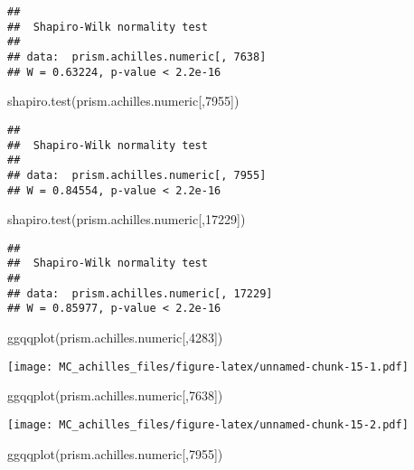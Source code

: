 \documentclass[
]{article}
\newenvironment{Shaded}{\begin{snugshade}}{\end{snugshade}}
\newcommand{\DecValTok}[1]{\textcolor[rgb]{0.00,0.00,0.81}{#1}}
\newcommand{\FunctionTok}[1]{\textcolor[rgb]{0.00,0.00,0.00}{#1}}
\newcommand{\NormalTok}[1]{#1}
\begin{document}
\begin{verbatim}
## 
##  Shapiro-Wilk normality test
## 
## data:  prism.achilles.numeric[, 7638]
## W = 0.63224, p-value < 2.2e-16
\end{verbatim}

\begin{Shaded}
\begin{Highlighting}[]
\FunctionTok{shapiro.test}\NormalTok{(prism.achilles.numeric[,}\DecValTok{7955}\NormalTok{])}
\end{Highlighting}
\end{Shaded}

\begin{verbatim}
## 
##  Shapiro-Wilk normality test
## 
## data:  prism.achilles.numeric[, 7955]
## W = 0.84554, p-value < 2.2e-16
\end{verbatim}

\begin{Shaded}
\begin{Highlighting}[]
\FunctionTok{shapiro.test}\NormalTok{(prism.achilles.numeric[,}\DecValTok{17229}\NormalTok{])}
\end{Highlighting}
\end{Shaded}

\begin{verbatim}
## 
##  Shapiro-Wilk normality test
## 
## data:  prism.achilles.numeric[, 17229]
## W = 0.85977, p-value < 2.2e-16
\end{verbatim}

\begin{Shaded}
\begin{Highlighting}[]
\FunctionTok{ggqqplot}\NormalTok{(prism.achilles.numeric[,}\DecValTok{4283}\NormalTok{])}
\end{Highlighting}
\end{Shaded}

\texttt{[image: MC\_achilles\_files/figure-latex/unnamed-chunk-15-1.pdf]}

\begin{Shaded}
\begin{Highlighting}[]
\FunctionTok{ggqqplot}\NormalTok{(prism.achilles.numeric[,}\DecValTok{7638}\NormalTok{])}
\end{Highlighting}
\end{Shaded}

\texttt{[image: MC\_achilles\_files/figure-latex/unnamed-chunk-15-2.pdf]}

\begin{Shaded}
\begin{Highlighting}[]
\FunctionTok{ggqqplot}\NormalTok{(prism.achilles.numeric[,}\DecValTok{7955}\NormalTok{])}
\end{Highlighting}
\end{Shaded}
\end{document}
